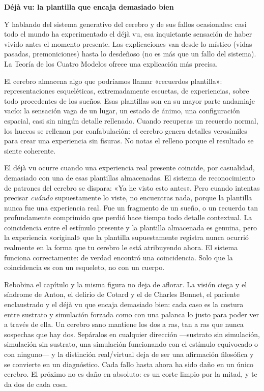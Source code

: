 \documentclass[11pt, twoside, openright]{book}
\begin{document}
\textbf{Déjà vu: la plantilla que encaja demasiado bien}

Y hablando del sistema generativo del cerebro y de sus fallos ocasionales: casi todo el mundo ha experimentado el déjà vu, esa inquietante sensación de haber vivido antes el momento presente. Las explicaciones van desde lo místico (vidas pasadas, premoniciones) hasta lo desdeñoso (no es más que un fallo del sistema). La Teoría de los Cuatro Modelos ofrece una explicación más precisa.

El cerebro almacena algo que podríamos llamar «recuerdos plantilla»: representaciones esqueléticas, extremadamente escuetas, de experiencias, sobre todo procedentes de los sueños. Esas plantillas son en su mayor parte andamiaje vacío: la sensación vaga de un lugar, un estado de ánimo, una configuración espacial, casi sin ningún detalle rellenado. Cuando recuperas un recuerdo normal, los huecos se rellenan por confabulación: el cerebro genera detalles verosímiles para crear una experiencia sin fisuras. No notas el relleno porque el resultado se siente coherente.

El déjà vu ocurre cuando una experiencia real presente coincide, por casualidad, demasiado con una de esas plantillas almacenadas. El sistema de reconocimiento de patrones del cerebro se dispara: «Ya he visto esto antes». Pero cuando intentas precisar \textit{cuándo} supuestamente lo viste, no encuentras nada, porque la plantilla nunca fue una experiencia real. Fue un fragmento de un sueño, o un recuerdo tan profundamente comprimido que perdió hace tiempo todo detalle contextual. La coincidencia entre el estímulo presente y la plantilla almacenada es genuina, pero la experiencia «original» que la plantilla supuestamente registra nunca ocurrió realmente en la forma que tu cerebro le está atribuyendo ahora. El sistema funciona correctamente: de verdad encontró una coincidencia. Solo que la coincidencia es con un esqueleto, no con un cuerpo.

Rebobina el capítulo y la misma figura no deja de aflorar. La visión ciega y el síndrome de Anton, el delirio de Cotard y el de Charles Bonnet, el paciente enclaustrado y el déjà vu que encaja demasiado bien: cada caso es la costura entre sustrato y simulación forzada como con una palanca lo justo para poder ver a través de ella. Un cerebro sano mantiene los dos a ras, tan a ras que nunca sospechas que hay dos. Sepáralos en cualquier dirección ---sustrato sin simulación, simulación sin sustrato, una simulación funcionando con el estímulo equivocado o con ninguno--- y la distinción real/\allowbreak{}virtual deja de ser una afirmación filosófica y se convierte en un diagnóstico. Cada fallo hasta ahora ha sido daño en un único cerebro. El próximo no es daño en absoluto: es un corte limpio por la mitad, y te da dos de cada cosa.
\end{document}
